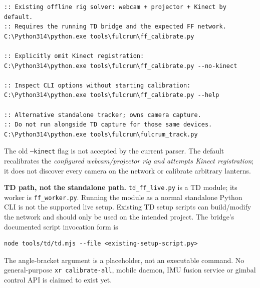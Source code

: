 \documentclass[11pt,a4paper]{article}
\begin{document}
\begin{lstlisting}
:: Existing offline rig solver: webcam + projector + Kinect by default.
:: Requires the running TD bridge and the expected FF network.
C:\Python314\python.exe tools\fulcrum\ff_calibrate.py

:: Explicitly omit Kinect registration:
C:\Python314\python.exe tools\fulcrum\ff_calibrate.py --no-kinect

:: Inspect CLI options without starting calibration:
C:\Python314\python.exe tools\fulcrum\ff_calibrate.py --help

:: Alternative standalone tracker; owns camera capture.
:: Do not run alongside TD capture for those same devices.
C:\Python314\python.exe tools\fulcrum\fulcrum_track.py
\end{lstlisting}
The old \texttt{--kinect} flag is not accepted by the current parser.
The default recalibrates the \emph{configured webcam/projector rig and
attempts Kinect registration}; it does not discover every camera on the
network or calibrate arbitrary lanterns.

\textbf{TD path, not the standalone path.}
\texttt{td\_ff\_live.py} is a TD module; its worker is
\texttt{ff\_worker.py}. Running the module as a normal standalone
Python CLI is not the supported live setup. Existing TD setup scripts can
build/modify the network and should only be used on the intended project.
The bridge's documented script invocation form is
\begin{lstlisting}
node tools/td/td.mjs --file <existing-setup-script.py>
\end{lstlisting}
The angle-bracket argument is a placeholder, not an executable command.
No general-purpose \texttt{xr calibrate-all}, mobile daemon, IMU fusion
service or gimbal control API is claimed to exist yet.
\end{document}
